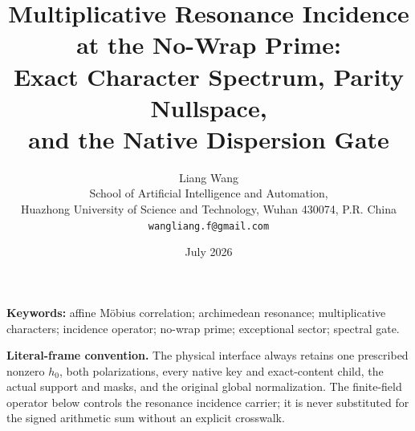 \documentclass[11pt]{article}
\title{Multiplicative Resonance Incidence at the No-Wrap Prime:\\
Exact Character Spectrum, Parity Nullspace,\\
and the Native Dispersion Gate}
\author{Liang Wang\\
School of Artificial Intelligence and Automation,\\
Huazhong University of Science and Technology, Wuhan 430074, P.R. China\\
\texttt{wangliang.f@gmail.com}}
\date{July 2026}
\theoremstyle{remark}
\begin{document}
\maketitle



\noindent\textbf{Keywords:} affine M\"obius correlation;
archimedean resonance; multiplicative characters; incidence
operator; no-wrap prime; exceptional sector; spectral gate.

\medskip
\noindent\textbf{Literal-frame convention.}
The physical interface always retains one prescribed nonzero
\(h_0\), both polarizations, every native key and exact-content
child, the actual support and masks, and the original global
normalization.  The finite-field operator below controls the
resonance incidence carrier; it is never substituted for the signed
arithmetic sum without an explicit crosswalk.











\begingroup
\footnotesize
\raggedright


\endgroup
\end{document}
